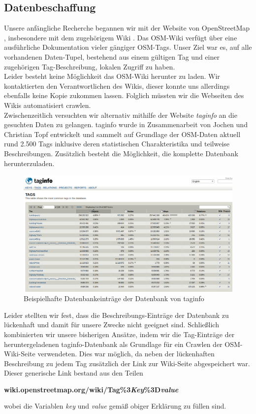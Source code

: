 \documentclass[12pt,pdftex,a4paper]{article}
\begin{document}
\subsection{Datenbeschaffung}
Unsere anfängliche Recherche begannen wir mit der Website von OpenStreetMap \cite{WebsiteOSM}, insbesondere mit dem zugehörigem Wiki \cite{WebsiteOSMWiki}. Das OSM-Wiki verfügt über eine ausführliche Dokumentation vieler gängiger OSM-Tags. Unser Ziel war es, auf alle vorhandenen Daten-Tupel, bestehend aus einem gültigen Tag und einer zugehörigen Tag-Beschreibung, lokalen Zugriff zu haben.
\\
Leider besteht keine Möglichkeit das OSM-Wiki herunter zu laden. Wir kontaktierten den Verantwortlichen des Wikis, dieser konnte uns allerdings ebenfalls keine Kopie zukommen lassen. Folglich müssten wir die Webseiten des Wikis automatisiert crawlen. 
\\
Zwischenzeitlich versuchten wir alternativ mithilfe der Website \textit{taginfo} \cite{taginfoWebsite} an die gesuchten Daten zu gelangen. taginfo wurde in Zusammenarbeit von Jochen und Christian Topf entwickelt und sammelt auf Grundlage der OSM-Daten aktuell rund 2.500 Tags inklusive deren statistischen Charakteristika und teilweise Beschreibungen\cite{taginfoAbout}. Zusätzlich besteht die Möglichkeit, die komplette Datenbank herunterzuladen.\\
\begin{figure}[h]
	\centering
	\includegraphics[width=0.9\linewidth]{Bilder/taginfo_example}
	\caption[Beispielhafte Darstellung taginfo]{Beispielhafte Datenbankeinträge der Datenbank von taginfo}
	\label{fig:taginfoexample}
\end{figure}

Leider stellten wir fest, dass die Beschreibungs-Einträge der Datenbank zu lückenhaft und damit für unsere Zwecke nicht geeignet sind.
Schließlich kombinierten wir unsere bisherigen Ansätze, indem wir die Tag-Einträge der heruntergeladenen taginfo-Datenbank als Grundlage für ein Crawlen der OSM-Wiki-Seite verwendeten. Dies war möglich, da neben der lückenhaften Beschreibung zu jedem Tag zusätzlich der Link zur Wiki-Seite abgespeichert war. Dieser generische Link bestand aus den Teilen
\begin{center}
	\textbf{wiki.openstreetmap.org/wiki/Tag\%3\textit{Key}\%3D\textit{value}}
\end{center}
wobei die Variablen \textit{key} und \textit{value} gemäß obiger Erklärung zu füllen sind.
\end{document}
